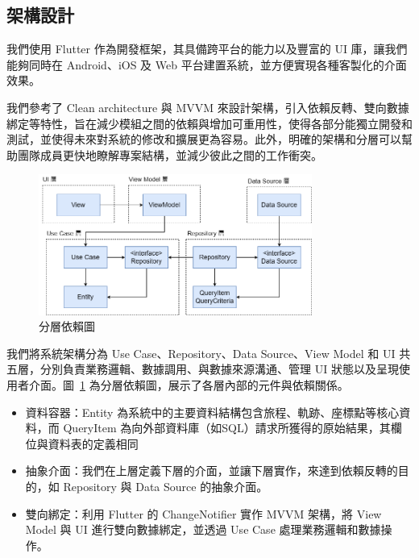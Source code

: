 \subsection{架構設計}

我們使用 Flutter 作為開發框架，其具備跨平台的能力以及豐富的 UI 庫，讓我們能夠同時在 Android、iOS 及 Web 平台建置系統，並方便實現各種客製化的介面效果。

我們參考了 Clean architecture 與 MVVM 來設計架構，引入依賴反轉、雙向數據綁定等特性，旨在減少模組之間的依賴與增加可重用性，使得各部分能獨立開發和測試，並使得未來對系統的修改和擴展更為容易。此外，明確的架構和分層可以幫助團隊成員更快地瞭解專案結構，並減少彼此之間的工作衝突。

\begin{figure}[H]
    \centering
    \includegraphics[width=0.8\textwidth]{assets/TT分層依賴圖.png}
    \caption{分層依賴圖}
    \label{分層依賴圖}
\end{figure}

我們將系統架構分為 Use Case、Repository、Data Source、View Model 和 UI 共五層，分別負責業務邏輯、數據調用、與數據來源溝通、管理 UI 狀態以及呈現使用者介面。圖~\ref{分層依賴圖} 為分層依賴圖，展示了各層內部的元件與依賴關係。

\begin{itemize}
    \item 資料容器：Entity 為系統中的主要資料結構包含旅程、軌跡、座標點等核心資料，而 QueryItem 為向外部資料庫（如SQL）請求所獲得的原始結果，其欄位與資料表的定義相同
    \item 抽象介面：我們在上層定義下層的介面，並讓下層實作，來達到依賴反轉的目的，如 Repository 與 Data Source 的抽象介面。
    \item 雙向綁定：利用 Flutter 的 ChangeNotifier 實作 MVVM 架構，將 View Model 與 UI 進行雙向數據綁定，並透過 Use Case 處理業務邏輯和數據操作。
\end{itemize}



